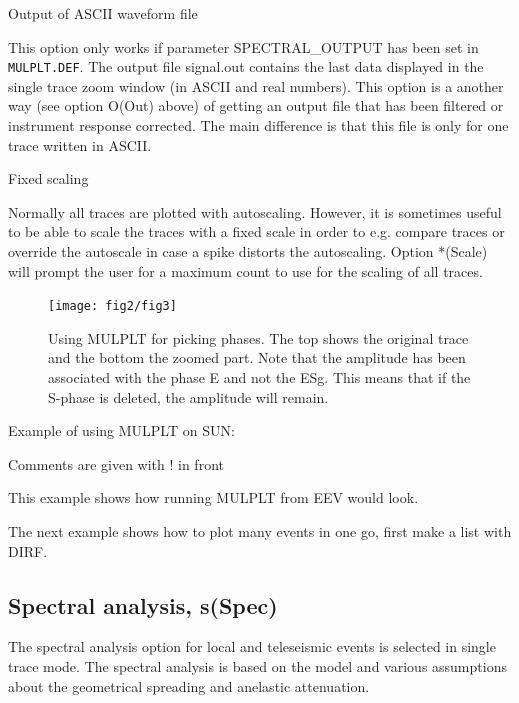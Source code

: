 Output of ASCII waveform file 

This option only works if parameter SPECTRAL\_OUTPUT has been set in \texttt{MULPLT.DEF}. The output file signal.out contains the last data displayed in the single trace zoom window (in ASCII and real numbers). This option is a another way (see option O(Out) above) of getting an output file that has been filtered or instrument response corrected.  The main difference is that this file is only for one trace written in ASCII. 

Fixed scaling 

Normally all traces are plotted with autoscaling. However, it is sometimes useful to be able to scale the traces with a fixed scale in order to e.g. compare traces or override the autoscale in case a spike distorts the autoscaling. Option *(Scale) will prompt the user for a maximum count to use for the scaling of all traces. 

\begin{figure}
\centerline{\texttt{[image: fig2/fig3]}}
\caption{Using MULPLT for picking phases. The top shows the original trace and the bottom the zoomed part. Note that the amplitude has been associated with the phase E and not the ESg. This means that if the S-phase is deleted, the amplitude will remain. 
}
\label{fig:mulplt-pick}
\end{figure}


Example of using MULPLT on SUN: 

Comments are given with ! in front 

This example shows how running MULPLT from EEV would look. 



The next example shows how to plot many events in one go, first make a list with DIRF. 



\subsection{Spectral analysis, s(Spec)}
\label{subs:spec}

The spectral analysis option for local and teleseismic events is selected in single trace mode.  The spectral analysis is based on the \citet{brune1970} model and various assumptions about the geometrical spreading and anelastic attenuation. 

